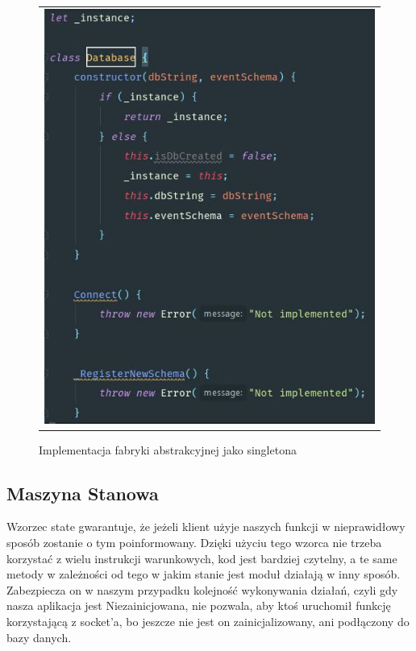 \documentclass{sprawozdanie-agh}
\begin{document}
	\begin{figure}[H] 
		\centering
		\begin{tabular}{c}
			\includegraphics[width=.75\textwidth]{singleton}
		\end{tabular} 
		\caption{Implementacja fabryki abstrakcyjnej jako singletona}
	\end{figure}
	
	\subsection{Maszyna Stanowa}
	
	Wzorzec state gwarantuje, że jeżeli klient użyje naszych funkcji w nieprawidłowy sposób zostanie o tym poinformowany. 
	Dzięki użyciu tego wzorca nie trzeba korzystać z wielu instrukcji warunkowych, kod jest bardziej czytelny, a te same metody w zależności od tego w jakim stanie jest moduł działają w inny sposób. Zabezpiecza on w naszym przypadku kolejność wykonywania działań, czyli gdy nasza aplikacja jest Niezainicjowana, nie pozwala, aby ktoś uruchomił funkcję korzystającą z socket’a, bo jeszcze nie jest on zainicjalizowany, ani podłączony do bazy danych.
	
\end{document}
